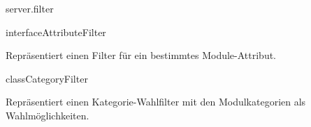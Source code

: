 \begin{texdocpackage}{server.filter}
\label{texdoclet:edu.kit.informatik.studyplan.server.filter}

\begin{texdocclass}{interface}{AttributeFilter}
\label{texdoclet:edu.kit.informatik.studyplan.server.filter.AttributeFilter}
\begin{texdocclassintro}
Repräsentiert einen Filter für ein bestimmtes Module-Attribut.\end{texdocclassintro}
\begin{texdocclassmethods}
\end{texdocclassmethods}
\end{texdocclass}


\begin{texdocclass}{class}{CategoryFilter}
\label{texdoclet:edu.kit.informatik.studyplan.server.filter.CategoryFilter}
\begin{texdocclassintro}
Repräsentiert einen Kategorie-Wahlfilter mit den Modulkategorien als Wahlmöglichkeiten.\end{texdocclassintro}
\begin{texdocclassconstructors}
\end{texdocclassconstructors}
\begin{texdocclassmethods}
\end{texdocclassmethods}
\end{texdocclass}



\end{texdocpackage}
